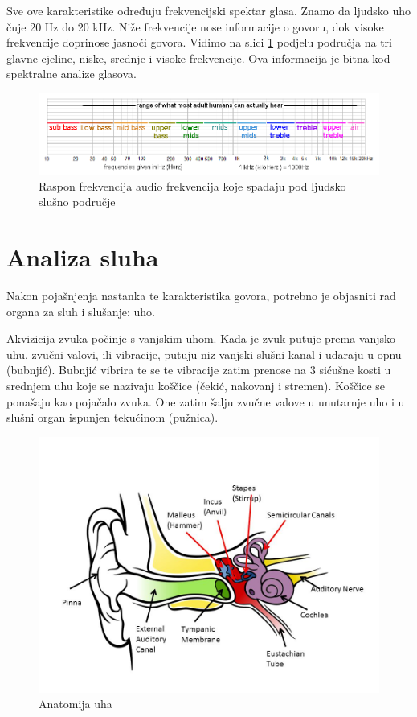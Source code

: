 \documentclass[times, utf8, diplomski]{fer}
\begin{document}
Sve ove karakteristike određuju frekvencijski spektar glasa. Znamo da ljudsko uho čuje 20 Hz do 20 kHz. Niže frekvencije nose informacije o govoru, dok visoke frekvencije doprinose jasnoći govora. Vidimo na slici \ref{raspon} podjelu područja na tri glavne cjeline, niske, srednje i visoke frekvencije. Ova informacija je bitna kod spektralne analize glasova.

\begin{figure}[hbt!]
 \centering
 \includegraphics[scale=0.5]{photos/raspon.png}
 \caption{Raspon frekvencija audio frekvencija koje spadaju pod ljudsko slušno područje}
 \label{raspon}
\end{figure}


\chapter{Analiza sluha}
\label{chap:sluh}
Nakon pojašnjenja nastanka te karakteristika govora, potrebno je objasniti rad organa za sluh i slušanje: uho.

Akvizicija zvuka počinje s vanjskim uhom. Kada je zvuk putuje prema vanjsko uhu, zvučni valovi, ili vibracije, putuju niz vanjski slušni kanal i udaraju u opnu (bubnjić). Bubnjić vibrira te se te vibracije zatim prenose na 3 sićušne kosti u srednjem uhu koje se nazivaju koščice (čekić, nakovanj i stremen). Koščice se ponašaju kao pojačalo zvuka. One zatim šalju zvučne valove u unutarnje uho i u slušni organ ispunjen tekućinom (pužnica).

\begin{figure}[hbt!]
 \centering
 \includegraphics[scale=0.5]{photos/earanatomy.png}
 \caption{Anatomija uha }
\end{figure}
\end{document}
